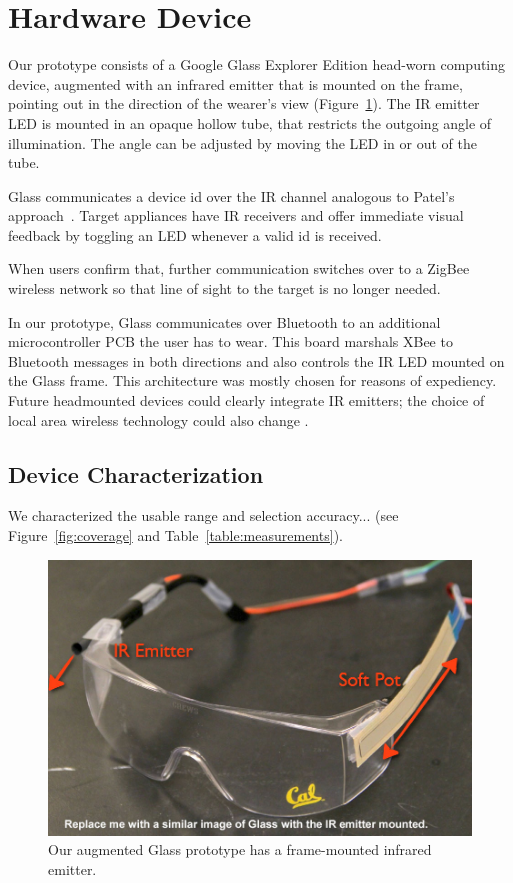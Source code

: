 \section{Hardware Device}

Our prototype consists of a Google Glass Explorer Edition head-worn computing device, augmented with an infrared emitter that is mounted on the frame, pointing out in the direction of the wearer's view (Figure~\ref{fig:glass}). The IR emitter LED is mounted in an opaque hollow tube, that restricts the outgoing angle of illumination. The angle can be adjusted by moving the LED in or out of the tube.

Glass communicates a device id over the IR channel analogous to Patel's approach~\cite{patel_2-way_2003}. Target appliances have IR receivers and offer immediate visual feedback by toggling an LED whenever a valid id is received.

When users confirm that, further communication switches over to a ZigBee wireless network so that line of sight to the target is no longer needed.

In our prototype, Glass communicates over Bluetooth to an additional microcontroller PCB the user has to wear. This board marshals XBee to Bluetooth messages in both directions and also controls the IR LED mounted on the Glass frame. This architecture was mostly chosen for reasons of expediency. Future headmounted devices could clearly integrate IR emitters; the choice of local area wireless technology could also change .  


\subsection{Device Characterization}
We characterized the usable range and selection accuracy... (see Figure~\ref{fig:coverage} and Table~\ref{table:measurements}).


\begin{figure}[t]
\centering
\includegraphics[width=1.0\columnwidth]{figures/glass-with-ir}
\caption{Our augmented Glass prototype has a frame-mounted infrared emitter.}
\label{fig:glass}
\end{figure}


